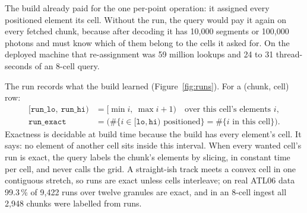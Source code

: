 \documentclass[10pt,a4paper]{article}
\newcommand{\code}[1]{\texttt{#1}}
\begin{document}
The build already paid for the one per-point operation: it assigned every positioned element its cell. Without the
run, the query would pay it again on every fetched chunk, because after decoding it has 10{,}000 segments or
100{,}000 photons and must know which of them belong to the cells it asked for. On the deployed machine that
re-assignment was 59 million lookups and 24 to 31 thread-seconds of an 8-cell query.

The run records what the build learned (Figure~\ref{fig:runs}). For a (chunk, cell) row:
\begin{align*}
[\code{run\_lo},\ \code{run\_hi}) &= \bigl[\min i,\ \max i + 1\bigr) \quad\text{over this cell's elements } i,\\
\code{run\_exact} &= \bigl(\#\{i \in [\code{lo},\code{hi}) \text{ positioned}\} = \#\{i \text{ in this cell}\}\bigr).
\end{align*}
Exactness is decidable at build time because the build has every element's cell. It says: no element of another
cell sits inside this interval. When every wanted cell's run is exact, the query labels the chunk's elements by
slicing, in constant time per cell, and never calls the grid. A straight-ish track meets a convex cell in one
contiguous stretch, so runs are exact unless cells interleave; on real ATL06 data 99.3\,\% of 9{,}422 runs over
twelve granules are exact, and in an 8-cell ingest all 2{,}948 chunks were labelled from runs.
\end{document}
